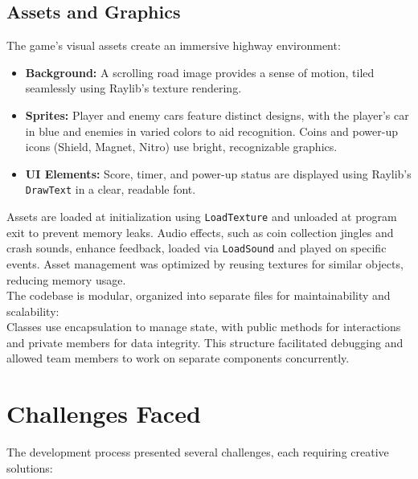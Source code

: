 \documentclass[12pt,a4paper]{article}
\begin{document}
\subsection{Assets and Graphics}

The game’s visual assets create an immersive highway environment: \\

\begin{itemize}
    \item \textbf{Background:} A scrolling road image provides a sense of motion, tiled seamlessly using Raylib’s texture rendering. \\
    \item \textbf{Sprites:} Player and enemy cars feature distinct designs, with the player’s car in blue and enemies in varied colors to aid recognition. Coins and power-up icons (Shield, Magnet, Nitro) use bright, recognizable graphics. \\
    \item \textbf{UI Elements:} Score, timer, and power-up status are displayed using Raylib’s \texttt{DrawText} in a clear, readable font. \\
\end{itemize}

Assets are loaded at initialization using \texttt{LoadTexture} and unloaded at program exit to prevent memory leaks. Audio effects, such as coin collection jingles and crash sounds, enhance feedback, loaded via \texttt{LoadSound} and played on specific events. Asset management was optimized by reusing textures for similar objects, reducing memory usage. \\

The codebase is modular, organized into separate files for maintainability and scalability: \\



Classes use encapsulation to manage state, with public methods for interactions and private members for data integrity. This structure facilitated debugging and allowed team members to work on separate components concurrently. \\

\section{Challenges Faced}

The development process presented several challenges, each requiring creative solutions: \\
\end{document}
